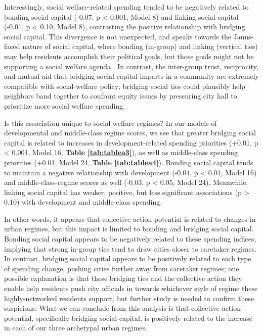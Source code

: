 \documentclass[preprint, 3p,
authoryear]{elsarticle} %
\begin{document}
Interestingly, social welfare-related spending tended to be negatively
related to bonding social capital (-0.07, p \textless{} 0.001, Model 8)
and linking social capital (-0.01, p \textless{} 0.10, Model 8),
contrasting the positive relationship with bridging social capital. This
divergence is not unexpected, and speaks towards the Janus-faced nature
of social capital, where bonding (in-group) and linking (vertical ties)
may help residents accomplish their political goals, but those goals
might not be supporting a social welfare agenda \citep{aldrich_2012}. In
contrast, the inter-group trust, reciprocity, and mutual aid that
bridging social capital imparts in a community are extremely compatible
with social-welfare policy; bridging social ties could plausibly help
neighbors band together to confront equity issues by pressuring city
hall to prioritize more social welfare spending.

Is this association unique to social welfare regimes? In our models of
developmental and middle-class regime scores, we see that greater
bridging social capital is related to increases in development-related
spending priorities (+0.01, p \textless{} 0.001, Model 16,
\textbf{Table \ref{tab:tablea3}}), as well as middle-class spending
priorities (+0.01, Model 24, \textbf{Table \ref{tab:tablea4}}). Bonding
social capital tends to maintain a negative relationship with
development (-0.04, p \textless{} 0.01, Model 16) and
middle-class-regime scores as well (-0.03, p \textless{} 0.05, Model
24). Meanwhile, linking social capital has weaker, positive, but less
significant associations (p \textgreater{} 0.10) with development and
middle-class spending.

In other words, it appears that collective action potential is related
to changes in urban regimes, but this impact is limited to bonding and
bridging social capital. Bonding social capital appears to be negatively
related to these spending indices, implying that strong in-group ties
tend to draw cities closer to caretaker regimes. In contrast, bridging
social capital appears to be positively related to each type of spending
change, pushing cities further away from caretaker regimes; one possible
explanation is that these bridging ties and the collective action they
enable help residents push city officials in towards whichever style of
regime these highly-networked residents support, but further study is
needed to confirm these suspicions. What we can conclude from this
analysis is that collective action potential, specifically bridging
social capital, is positively related to the increase in each of our
three archetypal urban regimes.
\end{document}

